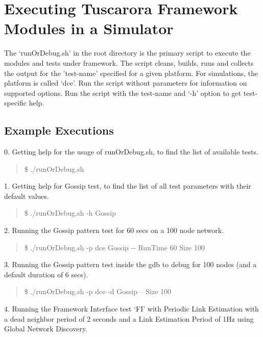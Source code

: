 \section{Executing Tuscarora Framework Modules in a Simulator}

The `runOrDebug.sh' in the root directory is the primary script to execute the modules and tests under framework. The script cleans, builds, runs and collects the output for the 'test-name' specified for a given platform. For simulations, the platform is called `dce'. Run the script without parameters for information on supported options. Run the script with the test-name and `-h' option to get test-specific help.


\subsection{Example Executions}


0. Getting help for the usage of runOrDebug.sh, to find the list of available tests.

\begin{quote}
	\$ ./runOrDebug.sh  \\
\end{quote}

1. Getting help for Gossip test, to find the list of all test parameters with their default values.

\begin{quote}
	\$ ./runOrDebug.sh -h Gossip  \\
\end{quote}

2. Running the Gossip pattern test for 60 secs on a 100 node network.

\begin{quote}
	\$ ./runOrDebug.sh -p dce Gossip -\mbox{}- RunTime 60 Size 100\\
\end{quote}


3. Running the Gossip pattern test inside the gdb to debug for 100 nodes (and a default duration of 6 secs).

\begin{quote}
	\$ ./runOrDebug.sh -p dce -d Gossip -- Size 100\\
\end{quote}


4. Running the Framework Interface test `FI' with Periodic Link Estimation with a dead neighbor period of 2 seconds and a Link Estimation Period of 1Hz using Global Network Discovery.

